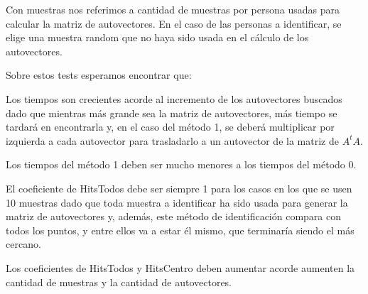 Con muestras nos referimos a cantidad de muestras por persona usadas para calcular la matriz de
autovectores. En el caso de las personas a identificar, se elige una muestra random que no haya sido
usada en el cálculo de los autovectores.

Sobre estos tests esperamos encontrar que:
\begin{compactitem}
  \item Los tiempos son crecientes acorde al incremento de los autovectores buscados dado que
  mientras más grande sea la matriz de autovectores, más tiempo se tardará en encontrarla y, en el
  caso del método 1, se deberá multiplicar por izquierda a cada autovector para trasladarlo a un
  autovector de la matriz de $A^t A$.
  \item Los tiempos del método 1 deben ser mucho menores a los tiempos del método 0.
  \item El coeficiente de HitsTodos debe ser siempre 1 para los casos en los que se usen 10 muestras
  dado que toda muestra a identificar ha sido usada para generar la matriz de autovectores y,
  además, este método de identificación compara con todos los puntos, y entre ellos va a estar él
  mismo, que terminaría siendo el más cercano.
  \item Los coeficientes de HitsTodos y HitsCentro deben aumentar acorde aumenten la cantidad de
  muestras y la cantidad de autovectores.
\end{compactitem}

